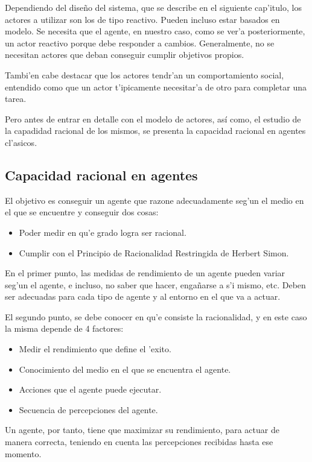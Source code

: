 \documentclass[12pt]{article}
\begin{document}
Dependiendo del diseño del sistema, que se describe en el siguiente cap'itulo, los actores a utilizar son
los de tipo reactivo. Pueden incluso estar basados en modelo. Se necesita que el agente, en nuestro caso, como se ver'a
posteriormente, un actor reactivo porque debe responder a cambios. Generalmente, no se necesitan actores que deban
conseguir cumplir objetivos propios.

Tambi'en cabe destacar que los actores tendr'an un comportamiento social, entendido como que un actor t'ipicamente
necesitar'a de otro para completar una tarea.

Pero antes de entrar en detalle con el modelo de actores, así como, el estudio de la capadidad racional de los mismos,
se presenta la capacidad racional en agentes cl'asicos.

\subsection{Capacidad racional en agentes}
\label{sub:capacidad racional en agentes}
El objetivo es conseguir un agente que razone adecuadamente seg'un el medio en el que se encuentre y conseguir dos cosas:

\begin{itemize}
	\item Poder medir en qu'e grado logra ser racional.
	\item Cumplir con el Principio de Racionalidad Restringida de Herbert Simon.
\end{itemize}

En el primer punto, las medidas de rendimiento de un agente pueden variar seg'un el agente, e incluso, no saber que hacer,
engañarse a s'i mismo, etc. Deben ser adecuadas para cada tipo de agente y al entorno en el que va a actuar.

El segundo punto, se debe conocer en qu'e consiste la racionalidad, y en este caso la misma depende de 4 factores:

\begin{itemize}
	\item Medir el rendimiento que define el 'exito.
	\item Conocimiento del medio en el que se encuentra el agente.
	\item Acciones que el agente puede ejecutar.
	\item Secuencia de percepciones del agente.
\end{itemize}

Un agente, por tanto, tiene que maximizar su rendimiento, para actuar de manera correcta, teniendo en cuenta las
percepciones recibidas hasta ese momento.
\end{document}
